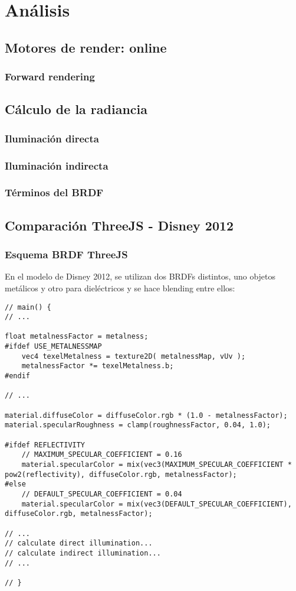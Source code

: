 \chapter{An\'alisis}

\section{Motores de render: online}
    \subsection{Forward rendering}

\section{C\'alculo de la radiancia}
    \subsection{Iluminaci\'on directa}
    \subsection{Iluminaci\'on indirecta}
    \subsection{T\'erminos del BRDF}

\section{Comparaci\'on ThreeJS - Disney 2012}
    \subsection{Esquema BRDF ThreeJS}
        En el modelo de Disney 2012, se utilizan dos BRDFs distintos, uno objetos metálicos y
        otro para dieléctricos y se hace blending entre ellos:
    \singlespacing
    \begin{lstlisting}[caption=My Javascript Example]
// main() {
// ...

float metalnessFactor = metalness;
#ifdef USE_METALNESSMAP
    vec4 texelMetalness = texture2D( metalnessMap, vUv );
    metalnessFactor *= texelMetalness.b;
#endif

// ...

material.diffuseColor = diffuseColor.rgb * (1.0 - metalnessFactor);
material.specularRoughness = clamp(roughnessFactor, 0.04, 1.0);

#ifdef REFLECTIVITY
    // MAXIMUM_SPECULAR_COEFFICIENT = 0.16
    material.specularColor = mix(vec3(MAXIMUM_SPECULAR_COEFFICIENT * pow2(reflectivity), diffuseColor.rgb, metalnessFactor);
#else
    // DEFAULT_SPECULAR_COEFFICIENT = 0.04
    material.specularColor = mix(vec3(DEFAULT_SPECULAR_COEFFICIENT), diffuseColor.rgb, metalnessFactor);

// ...
// calculate direct illumination...
// calculate indirect illumination...
// ...
                                 
// }
    \end{lstlisting}

